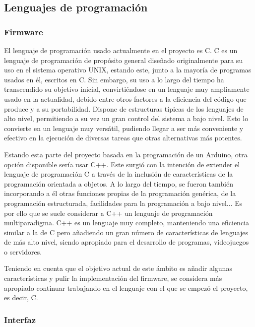 \subsection{Lenguajes de programación}

\subsubsection{Firmware}

El lenguaje de programación usado actualmente en el proyecto es C. C es un lenguaje de programación de propósito general diseñado originalmente para su uso en el sistema operativo UNIX, estando este, junto a la mayoría de programas usados en él, escritos en C. Sin embargo, su uso a lo largo del tiempo ha transcendido su objetivo inicial, convirtiéndose en un lenguaje muy ampliamente usado en la actualidad, debido entre otros factores a la eficiencia del código que produce y a su portabilidad. Dispone de estructuras típicas de los lenguajes de alto nivel, permitiendo a su vez un gran control del sistema a bajo nivel. Esto lo convierte en un lenguaje muy versátil, pudiendo llegar a ser más conveniente y efectivo en la ejecución de diversas tareas que otras alternativas más potentes. \cite{k&r}

Estando esta parte del proyecto basada en la programación de un Arduino, otra opción disponible sería usar C++. Este surgió con la intención de extender el lenguaje de programación C a través de la inclusión de características de la programación orientada a objetos. A lo largo del tiempo, se fueron también incorporando a él otras funciones propias de la programación genérica, de la programación estructurada, facilidades para la programación a bajo nivel... Es por ello que se suele considerar a C++ un lenguaje de programación multiparadigma. C++ es un lenguaje muy completo, manteniendo una eficiencia similar a la de C pero añadiendo un gran número de características de lenguajes de más alto nivel, siendo apropiado para el desarrollo de programas, videojuegos o servidores.

Teniendo en cuenta que el objetivo actual de este ámbito es añadir algunas características y pulir la implementación del firmware, se considera más apropiado continuar trabajando en el lenguaje con el que se empezó el proyecto, es decir, C. 

\subsubsection{Interfaz}

